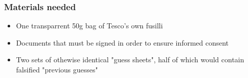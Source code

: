 \documentclass{article}
\begin{document}
\subsubsection{Materials needed}
\begin{itemize}
  \item One transparrent 50g bag of Tesco's own fusilli
  \item Documents that must be signed in order to ensure informed consent
  \item Two sets of othewise identical "guess sheets", half of which would contain falsified "previous guesses"
\end{itemize}
\end{document}
